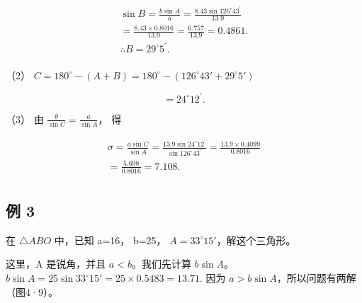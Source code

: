 \[
\begin{array}{l} \sin B = \frac {b \sin A}{a} = \frac {8.43 \sin 126 ^{\circ} 43 ^{\prime}}{13.9} \\ = \frac {8.43 \times 0.8016}{13.9} = \frac {6.757}{13.9} = 0.4861. \\ \therefore B = 29 ^{\circ} 5 ^{\prime}. \\ \end{array}
\]

（2）
\(C = 180^{\circ} - (A + B) = 180^{\circ} - (126^{\circ}43' + 29^{\circ}5')\)

\[
= 24 ^{\circ} 12 ^{\prime}.
\]

（3） 由 \(\frac{\theta}{\sin C} = \frac{a}{\sin A}\)， 得

\[
\begin{array}{l} \sigma = \frac {a \sin C}{\sin A} = \frac {13.9 \sin 24 ^{\circ} 12 ^{\prime}}{\sin 126 ^{\circ} 43 ^{\prime}} = \frac {13.9 \times 0.4099}{0.8016} \\ = \frac {5.698}{0.8016} = 7.108. \\ \end{array}
\]

\subsection{例 3}

在 \(\triangle ABO\) 中，已知 a=16， b=25，
\(A=33^{\circ}15'\)，解这个三角形。

 这里，A 是锐角，并且 \(a < b\)。我们先计算
\(b \sin A\)。
\(b \sin A = 25 \sin 33^{\circ} 15' = 25 \times 0.5483 = 13.71.\) 因为
\(a > b\sin A\)，所以问题有两解（图4·9）。

